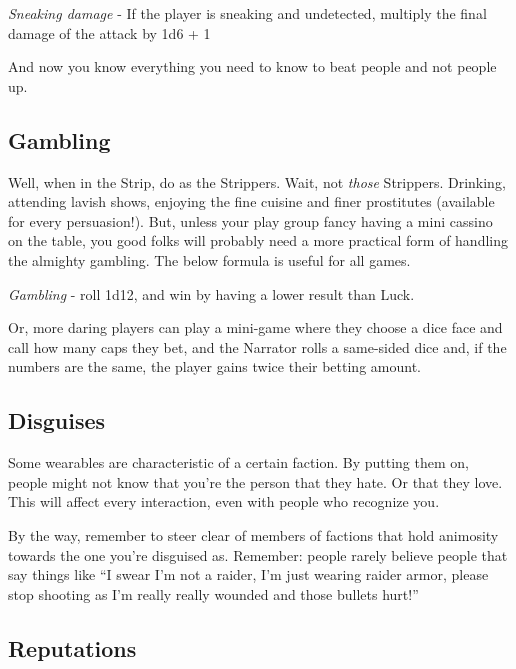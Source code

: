 \begin{center}
        \textit{Sneaking damage} - If the player is sneaking and undetected, multiply the final damage of the attack by 1d6 + 1
\end{center}        

And now you know everything you need to know to beat people and not people up.

\subsection{Gambling}

Well, when in the Strip, do as the Strippers. Wait, not \textit{those} Strippers. Drinking, attending lavish shows, enjoying the fine cuisine and finer prostitutes (available for every persuasion!). But, unless your play group fancy having a mini cassino on the table, you good folks will probably need a more practical form of handling the almighty gambling. The below formula is useful for all games.

\begin{center}
	\textit{Gambling} - roll 1d12, and win by having a lower result than Luck.
\end{center}

Or, more daring players can play a mini-game where they choose a dice face and call how many caps they bet, and the Narrator rolls a same-sided dice and, if the numbers are the same, the player gains twice their betting amount.

\subsection{Disguises}

Some wearables are characteristic of a certain faction. By putting them on, people might not know that you're the person that they hate. Or that they love. This will affect every interaction, even with people who recognize you.

By the way, remember to steer clear of members of factions that hold animosity towards the one you're disguised as. Remember: people rarely believe people that say things like ``I swear I'm not a raider, I'm just wearing raider armor, please stop shooting as I'm really really wounded and those bullets hurt!''

\subsection{Reputations} 

